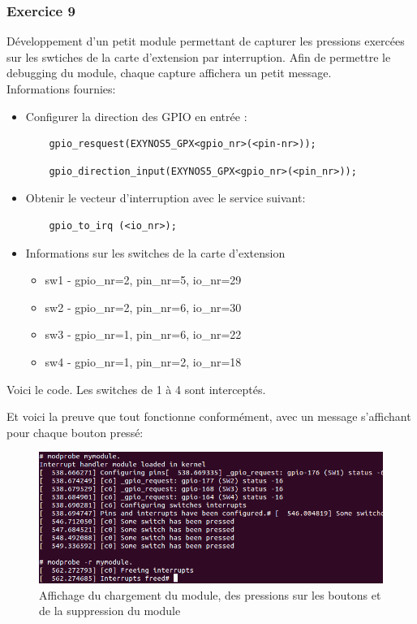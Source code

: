 \subsubsection{Exercice 9}
Développement d'un petit module permettant de capturer les pressions exercées sur les swtiches de la carte d'extension par interruption. Afin de permettre le debugging du module, chaque capture affichera un petit message.\\
Informations fournies:
\begin{itemize}
	\item Configurer la direction des GPIO en entrée : 
	\begin{lstlisting}
	gpio_resquest(EXYNOS5_GPX<gpio_nr>(<pin-nr>));
	\end{lstlisting}
	\begin{lstlisting}
	gpio_direction_input(EXYNOS5_GPX<gpio_nr>(<pin_nr>));
	\end{lstlisting}
	\item Obtenir le vecteur d'interruption avec le service suivant:
	\begin{lstlisting}
	gpio_to_irq (<io_nr>);
	\end{lstlisting}
	\item Informations sur les switches de la carte d'extension 
	\begin{itemize}
	\item sw1 - gpio\_nr=2, pin\_nr=5,  io\_nr=29
	\item sw2 - gpio\_nr=2, pin\_nr=6,  io\_nr=30
	\item sw3 - gpio\_nr=1, pin\_nr=6,  io\_nr=22
	\item sw4 - gpio\_nr=1, pin\_nr=2,  io\_nr=18\\
	\end{itemize}
\end{itemize}
Voici le code. Les switches de 1 à 4 sont interceptés. 

Et voici la preuve que tout fonctionne conformément, avec un message s'affichant pour chaque bouton pressé:
\begin{figure}[H]
	\begin{center}
		\includegraphics[width=14cm]{img/interrupt_success.png}
		\caption{Affichage du chargement du module, des pressions sur les boutons et de la suppression du module}
		\label{ser1ex9}
	\end{center}
\end{figure}
